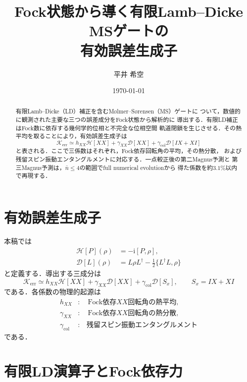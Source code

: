 \documentclass[dvipdfmx,a4paper,10pt]{jsarticle}
\title{Fock状態から導く有限Lamb--Dicke MSゲートの\\
有効誤差生成子}
\author{平井 希空}
\date{\today}
\newcommand{\ii}{\mathrm{i}}
\newcommand{\Hc}{\mathcal{H}}
\newcommand{\Dc}{\mathcal{D}}
\begin{document}
\maketitle

\begin{abstract}
有限Lamb--Dicke（LD）補正を含むM{\o}lmer--S{\o}rensen（MS）ゲートに
ついて，数値的に観測された主要な三つの誤差成分をFock状態から解析的に
導出する．有限LD補正はFock数に依存する幾何学的位相と不完全な位相空間
軌道閉鎖を生じさせる．その熱平均を取ることにより，有効誤差生成子は
\[
 \mathcal{K}_{\mathrm{err}}
 \simeq
 h_{XX}\Hc[XX]
 +\gamma_{XX}\Dc[XX]
 +\gamma_{\mathrm{col}}\Dc[IX+XI]
\]
と表される．ここで三係数はそれぞれ，Fock依存回転角の平均，その熱分散，
および残留スピン振動エンタングルメントに対応する．一点較正後の第二Magnus予測と
第三Magnus予測は，$\bar n\leq4$の範囲でfull numerical evolutionから
得た係数を約$3.1\%$以内で再現する．
\end{abstract}

\section{有効誤差生成子}

本稿では
\begin{align}
 \Hc[P](\rho)&=-\ii[P,\rho],\\
 \Dc[L](\rho)&=
 L\rho L^\dagger-\frac{1}{2}\{L^\dagger L,\rho\}
\end{align}
と定義する．導出する三成分は
\begin{equation}
 \boxed{
 \mathcal{K}_{\mathrm{err}}
 \simeq
 h_{XX}\Hc[XX]
 +\gamma_{XX}\Dc[XX]
 +\gamma_{\mathrm{col}}\Dc[S_x],
 \qquad S_x=IX+XI
 }
 \label{eq:main_generator}
\end{equation}
である．各係数の物理的起源は
\begin{align}
 h_{XX}
 &:\quad \text{Fock依存$XX$回転角の熱平均},\nonumber\\
 \gamma_{XX}
 &:\quad \text{Fock依存$XX$回転角の熱分散},\nonumber\\
 \gamma_{\mathrm{col}}
 &:\quad \text{残留スピン振動エンタングルメント}
 \label{eq:physical_origins}
\end{align}
である．

\section{有限LD演算子とFock依存力}
\end{document}
